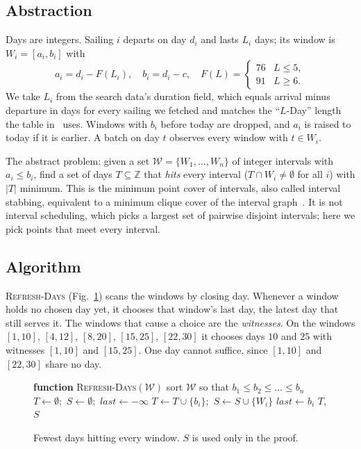 \subsection{Abstraction}
\label{sec:greedy-abstraction}

Days are integers. Sailing $i$ departs on day $d_i$ and lasts $L_i$ days;
its window is $W_i=[a_i,b_i]$ with
\begin{equation}
a_i=d_i-F(L_i),\quad b_i=d_i-c,\quad
F(L)=\begin{cases}76 & L\le5,\\ 91 & L\ge6.\end{cases}
\label{eq:greedy-window}
\end{equation}
We take $L_i$ from the search data's duration field, which equals arrival
minus departure in days for every sailing we fetched and matches the
``$L$-Day'' length the table in~\cite{carnival481} uses. Windows with $b_i$ before
today are dropped, and $a_i$ is raised to today if it is earlier. A batch on
day $t$ observes every window with $t\in W_i$.

The abstract problem: given a set $\mathcal{W}=\{W_1,\dots,W_n\}$ of integer
intervals with $a_i\le b_i$, find a set of days $T\subseteq\mathbb{Z}$ that
\emph{hits} every interval ($T\cap W_i\ne\emptyset$ for all $i$) with $|T|$
minimum. This is the minimum point cover of intervals, also called interval
stabbing, equivalent to a minimum clique cover of the interval
graph~\cite{gupta1982interval}. It is not interval scheduling, which picks a largest set of pairwise
disjoint intervals; here we pick points that meet every interval.

\subsection{Algorithm}
\label{sec:greedy-algorithm}

\textsc{Refresh-Days} (Fig.~\ref{fig:greedy-alg}) scans the windows by
closing day. Whenever a window holds no chosen day yet, it chooses that
window's last day, the latest day that still serves it. The windows that
cause a choice are the \emph{witnesses}. On the windows $[1,10]$, $[4,12]$,
$[8,20]$, $[15,25]$, $[22,30]$ it chooses days $10$ and $25$ with witnesses
$[1,10]$ and $[15,25]$. One day cannot suffice, since $[1,10]$ and $[22,30]$
share no day.

\begin{figure}[t]
\begin{algorithmic}[1]
\STATE \textbf{function} \textsc{Refresh-Days}$(\mathcal{W})$
\STATE sort $\mathcal{W}$ so that $b_1\le b_2\le\dots\le b_n$
\STATE $T\gets\emptyset$;\ $S\gets\emptyset$;\ $\mathit{last}\gets-\infty$
    \STATE $T\gets T\cup\{b_i\}$;\ $S\gets S\cup\{W_i\}$
    \STATE $\mathit{last}\gets b_i$
  \ENDIF
\ENDFOR
\RETURN $T$, $S$ 
\end{algorithmic}
\caption{Fewest days hitting every window. $S$ is used only in the proof.}
\label{fig:greedy-alg}
\end{figure}

